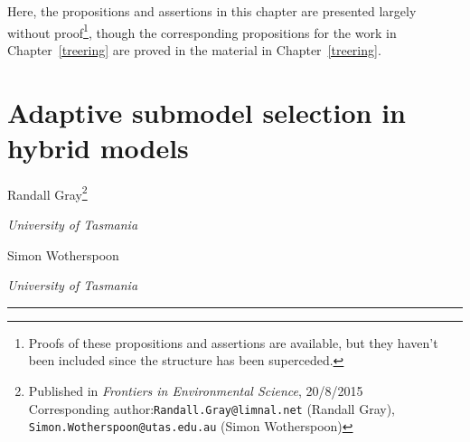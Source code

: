 Here, the propositions and assertions in this chapter are presented
largely without proof\footnote{Proofs of these propositions and
  assertions are available, but they haven't been included since the
  structure has been superceded.}, though the corresponding propositions
for the work in Chapter~\ref{treering} are proved in the material in
Chapter~\ref{treering}.

\pagebreak
{}
\section*{Adaptive submodel selection in hybrid  models}

\begin{center}
  Randall Gray\footnote{{Published in \emph{Frontiers in Environmental Science}, 20/8/2015}\\
    Corresponding author:\texttt{Randall.Gray@limnal.net} (Randall Gray),\\
      \texttt{Simon.Wotherspoon@utas.edu.au} (Simon Wotherspoon)
      }

    \emph{University of Tasmania}

    Simon Wotherspoon 

    \emph{University of Tasmania}
\end{center}

\rule{\textwidth}{2pt}

